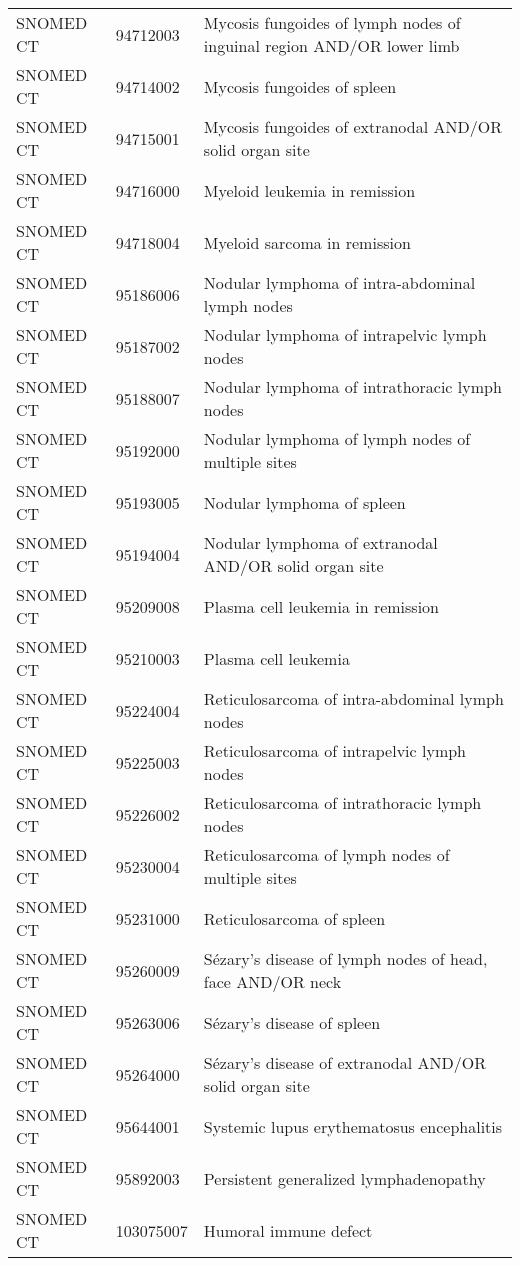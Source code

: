 \begin{longtable}{p{}p{}p{}}
  SNOMED CT & 94712003 & Mycosis fungoides of lymph nodes of inguinal region AND/OR lower limb \\ 
  SNOMED CT & 94714002 & Mycosis fungoides of spleen \\ 
  SNOMED CT & 94715001 & Mycosis fungoides of extranodal AND/OR solid organ site \\ 
  SNOMED CT & 94716000 & Myeloid leukemia in remission \\ 
  SNOMED CT & 94718004 & Myeloid sarcoma in remission \\ 
  SNOMED CT & 95186006 & Nodular lymphoma of intra-abdominal lymph nodes \\ 
  SNOMED CT & 95187002 & Nodular lymphoma of intrapelvic lymph nodes \\ 
  SNOMED CT & 95188007 & Nodular lymphoma of intrathoracic lymph nodes \\ 
  SNOMED CT & 95192000 & Nodular lymphoma of lymph nodes of multiple sites \\ 
  SNOMED CT & 95193005 & Nodular lymphoma of spleen \\ 
  SNOMED CT & 95194004 & Nodular lymphoma of extranodal AND/OR solid organ site \\ 
  SNOMED CT & 95209008 & Plasma cell leukemia in remission \\ 
  SNOMED CT & 95210003 & Plasma cell leukemia \\ 
  SNOMED CT & 95224004 & Reticulosarcoma of intra-abdominal lymph nodes \\ 
  SNOMED CT & 95225003 & Reticulosarcoma of intrapelvic lymph nodes \\ 
  SNOMED CT & 95226002 & Reticulosarcoma of intrathoracic lymph nodes \\ 
  SNOMED CT & 95230004 & Reticulosarcoma of lymph nodes of multiple sites \\ 
  SNOMED CT & 95231000 & Reticulosarcoma of spleen \\ 
  SNOMED CT & 95260009 & Sézary's disease of lymph nodes of head, face AND/OR neck \\ 
  SNOMED CT & 95263006 & Sézary's disease of spleen \\ 
  SNOMED CT & 95264000 & Sézary's disease of extranodal AND/OR solid organ site \\ 
  SNOMED CT & 95644001 & Systemic lupus erythematosus encephalitis \\ 
  SNOMED CT & 95892003 & Persistent generalized lymphadenopathy \\ 
  SNOMED CT & 103075007 & Humoral immune defect \\ 

\end{longtable}
